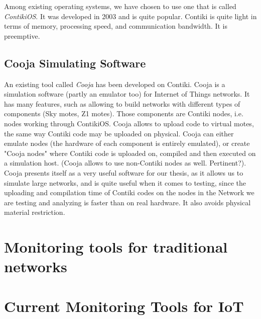 Among existing operating systems, we have chosen to use one that is called \textit{ContikiOS}. It was developed in 2003 and is quite popular. Contiki is quite light in terms of memory, processing speed, and communication bandwidth. It is preemptive.\\


\subsection{Cooja Simulating Software}
An existing tool called \textit{Cooja} has been developed on Contiki. Cooja is a simulation software (partly an emulator too) for Internet of Things networks. It has many features, such as allowing to build networks with different types of components (Sky motes, Z1 motes). Those components are Contiki nodes, i.e. nodes working through ContikiOS. Cooja allows to upload code to virtual motes, the same way Contiki code may be uploaded on physical. Cooja can either emulate nodes (the hardware of each component is entirely emulated), or create "Cooja nodes" where Contiki code is uploaded on, compiled and then executed on a simulation host. (Cooja allows to use non-Contiki nodes as well. Pertinent?). Cooja presents itself as a very useful software for our thesis, as it allows us to simulate large networks, and is quite useful when it comes to testing, since the uploading and compilation time of Contiki codes on the nodes in the Network we are testing and analyzing is faster than on real hardware. It also avoids physical material restriction.

\section{Monitoring tools for traditional networks}

\section{Current Monitoring Tools for IoT}
